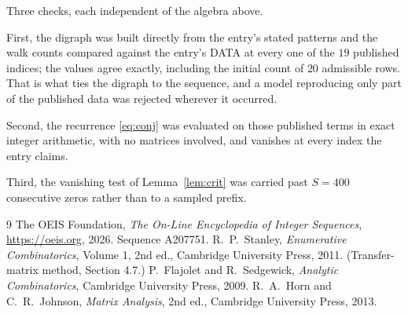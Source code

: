 \documentclass[11pt,a4paper]{article}
\theoremstyle{plain}
\theoremstyle{definition}
\begin{document}
Three checks, each independent of the algebra above.

First, the digraph was built directly from the entry's stated patterns and the walk counts
compared against the entry's DATA at every one of the $19$ published indices; the
values agree exactly, including the initial count of $20$ admissible rows. That is
what ties the digraph to the sequence, and a model reproducing only part of the published
data was rejected wherever it occurred.

Second, the recurrence \eqref{eq:conj} was evaluated on those published terms in exact
integer arithmetic, with no matrices involved, and vanishes at every index the entry claims.

Third, the vanishing test of Lemma~\ref{lem:crit} was carried past $S=400$ consecutive
zeros rather than to a sampled prefix.

\begin{thebibliography}{9}
 The OEIS Foundation, \emph{The On-Line Encyclopedia of Integer
Sequences}, \url{https://oeis.org}, 2026. Sequence A207751.
 R.~P.~Stanley, \emph{Enumerative Combinatorics}, Volume 1, 2nd ed.,
Cambridge University Press, 2011. (Transfer-matrix method, Section 4.7.)
 P.~Flajolet and R.~Sedgewick, \emph{Analytic Combinatorics}, Cambridge
University Press, 2009.
 R.~A.~Horn and C.~R.~Johnson, \emph{Matrix Analysis}, 2nd ed., Cambridge
University Press, 2013.
\end{thebibliography}
\end{document}
